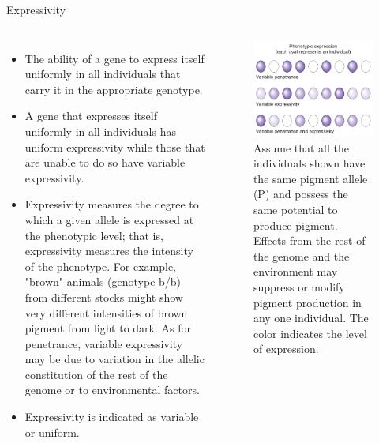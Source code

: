 \documentclass[11pt,ignorenonframetext,aspectratio=169]{beamer}
\begin{document}
\begin{frame}{Expressivity}
\protect\hypertarget{expressivity}{}
\begin{columns}[T, onlytextwidth]
\begin{itemize}
\small
\item The ability of a gene to express itself uniformly in all individuals that carry it in the appropriate genotype.
\item A gene that expresses itself uniformly in all individuals has uniform expressivity while those that are unable to do so have variable expressivity. 
\item Expressivity measures the degree to which a given allele is expressed at the phenotypic level; that is, expressivity measures the intensity of the phenotype. For example, "brown" animals (genotype b/b) from different stocks might show very different intensities of brown pigment from light to dark. As for penetrance, variable expressivity may be due to variation in the allelic constitution of the rest of the genome or to environmental factors.
\item Expressivity is indicated as variable or uniform.
\end{itemize}


\begin{figure}

{\centering \includegraphics[width=0.9\linewidth]{./images/penetrance_expressivity} 

}

\caption{Assume that all the individuals shown have the same pigment allele (P) and possess the same potential to produce pigment. Effects from the rest of the genome and the environment may suppress or modify pigment production in any one individual. The color indicates the level of expression.}\label{fig:expressivity}
\end{figure}

\end{columns}
\end{frame}
\end{document}
